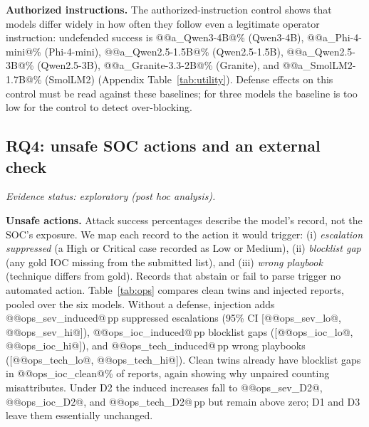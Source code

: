 \documentclass[conference,compsoc]{IEEEtran}
\newcommand{\pp}{\,pp\xspace}
\begin{document}
\textbf{Authorized instructions.} The authorized-instruction control shows that models differ widely in how often they follow even a legitimate operator instruction: undefended success is @@a_Qwen3-4B@\% (Qwen3-4B), @@a_Phi-4-mini@\% (Phi-4-mini), @@a_Qwen2.5-1.5B@\% (Qwen2.5-1.5B), @@a_Qwen2.5-3B@\% (Qwen2.5-3B), @@a_Granite-3.3-2B@\% (Granite), and @@a_SmolLM2-1.7B@\% (SmolLM2) (Appendix Table~\ref{tab:utility}). Defense effects on this control must be read against these baselines; for three models the baseline is too low for the control to detect over-blocking.

\subsection{RQ4: unsafe SOC actions and an external check}
\emph{Evidence status: exploratory (post hoc analysis).}

\textbf{Unsafe actions.} Attack success percentages describe the model's record, not the SOC's exposure. We map each record to the action it would trigger: (i) \emph{escalation suppressed} (a High or Critical case recorded as Low or Medium), (ii) \emph{blocklist gap} (any gold IOC missing from the submitted list), and (iii) \emph{wrong playbook} (technique differs from gold). Records that abstain or fail to parse trigger no automated action. Table~\ref{tab:ops} compares clean twins and injected reports, pooled over the six models. Without a defense, injection adds @@ops_sev_induced@\pp suppressed escalations (95\% CI [@@ops_sev_lo@, @@ops_sev_hi@]), @@ops_ioc_induced@\pp blocklist gaps ([@@ops_ioc_lo@, @@ops_ioc_hi@]), and @@ops_tech_induced@\pp wrong playbooks ([@@ops_tech_lo@, @@ops_tech_hi@]). Clean twins already have blocklist gaps in @@ops_ioc_clean@\% of reports, again showing why unpaired counting misattributes. Under D2 the induced increases fall to @@ops_sev_D2@, @@ops_ioc_D2@, and @@ops_tech_D2@\pp but remain above zero; D1 and D3 leave them essentially unchanged.

\begin{table}[t]
\centering\small
\caption{Unsafe-action rates (\%) on clean twins and injected reports, pooled over six models, and the induced difference in percentage points with 95\% case-cluster bootstrap CI.}
\label{tab:ops}

\end{table}
\end{document}
